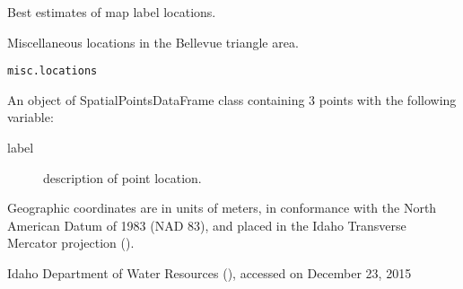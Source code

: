\documentclass[a4paper]{book}
\begin{document}
%
\begin{Source}\relax
Best estimates of map label locations.
\end{Source}
%
\begin{Examples}
\end{Examples}
%
\begin{Description}\relax
Miscellaneous locations in the Bellevue triangle area.
\end{Description}
%
\begin{Usage}
\begin{verbatim}
misc.locations
\end{verbatim}
\end{Usage}
%
\begin{Format}
An object of SpatialPointsDataFrame class containing 3 points
with the following variable:
\begin{description}

\item[label] description of point location.

\end{description}

Geographic coordinates are in units of meters, in conformance with the
North American Datum of 1983 (NAD 83), and placed in the
Idaho Transverse Mercator projection ().
\end{Format}
%
\begin{Source}\relax
Idaho Department of Water Resources
(),
accessed on December 23, 2015
\end{Source}
%
\begin{Examples}
\end{Examples}
\end{document}
